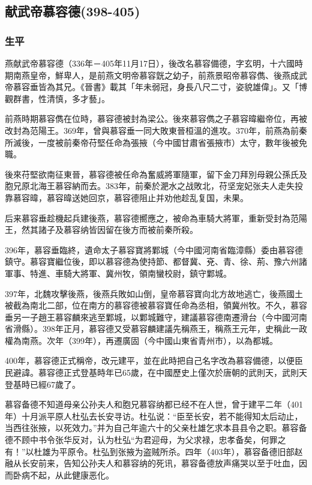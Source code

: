 
\subsection{献武帝慕容德\tiny(398-405)}

\subsubsection{生平}

燕献武帝慕容德（336年－405年11月17日），後改名慕容備德，字玄明，十六國時期南燕皇帝，鮮卑人，是前燕文明帝慕容皝之幼子，前燕景昭帝慕容儁、後燕成武帝慕容垂皆為其兄。《晉書》載其「年未弱冠，身長八尺二寸，姿貌雄偉」。又「博觀群書，性清慎，多才藝」。

前燕時期慕容儁在位時，慕容德被封為梁公。後來慕容儁之子慕容暐繼帝位，再被改封為范陽王。369年，曾與慕容垂一同大敗東晉桓溫的進攻。370年，前燕為前秦所滅後，一度被前秦帝苻堅任命為張掖（今中國甘肅省張掖市）太守，數年後被免職。

後來苻堅欲南征東晉，慕容德被任命為奮威將軍隨軍，留下金刀拜別母親公孫氏及胞兄原北海王慕容納而去。383年，前秦於淝水之战敗北，苻坚宠妃张夫人走失投靠慕容暐，慕容暐送她回京，慕容德阻止并劝他趁乱复国，未果。

后来慕容垂趁機起兵建後燕，慕容德嚮應之，被命為車騎大將軍，重新受封為范陽王，然其諸子及慕容纳皆因留在後方而被前秦所殺。

396年，慕容垂臨終，遺命太子慕容寶將鄴城（今中國河南省臨漳縣）委由慕容德鎮守。慕容寶繼位後，即以慕容德為使持節、都督冀、兗、青、徐、荊、豫六州諸軍事、特進、車騎大將軍、冀州牧，領南蠻校尉，鎮守鄴城。

397年，北魏攻擊後燕，後燕兵敗如山倒，皇帝慕容寶向北方故地逃亡，後燕國土被截為南北二部，位在南方的慕容德被慕容寶任命為丞相，領冀州牧。不久，慕容垂另一子趙王慕容麟來逃至鄴城，以鄴城難守，建議慕容德南遷滑台（今中國河南省滑縣）。398年正月，慕容德又受慕容麟建議先稱燕王，稱燕王元年，史稱此一政權為南燕。次年（399年），再遷廣固（今中國山東省青州市），以為都城。

400年，慕容德正式稱帝，改元建平，並在此時把自己名字改為慕容備德，以便臣民避諱。慕容德正式登基時年已65歲，在中國歷史上僅次於唐朝的武則天，武則天登基時已經67歲了。

慕容备德不知道母亲公孙夫人和胞兄慕容纳都已经不在人世，曾于建平二年（401年）十月派平原人杜弘去长安寻访。杜弘说：“臣至长安，若不能得知太后动止，当西往张掖，以死效力。”并为自己年逾六十的父亲杜雄乞求本县县令之职。慕容备德不顾中书令张华反对，认为杜弘“为君迎母，为父求禄，忠孝备矣，何罪之有！”以杜雄为平原令。杜弘到张掖为盗贼所杀。四年（403年），慕容备德旧部赵融从长安前来，告知公孙夫人和慕容纳的死讯，慕容备德放声痛哭以至于吐血，因而卧病不起，从此健康恶化。

